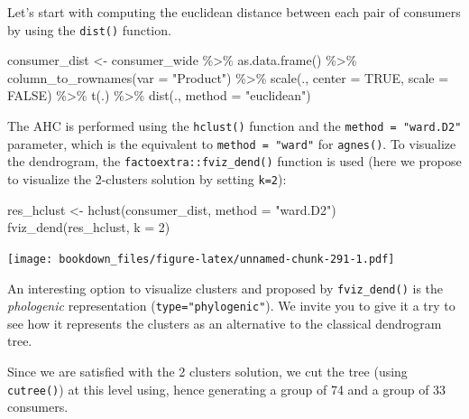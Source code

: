 \documentclass[
]{krantz}
\makeatletter
\newenvironment{Shaded}{\begin{snugshade}}{\end{snugshade}}
\newcommand{\AttributeTok}[1]{\textcolor[rgb]{0.61,0.61,0.61}{#1}}
\newcommand{\ConstantTok}[1]{\textcolor[rgb]{0,0,0}{#1}}
\newcommand{\DecValTok}[1]{\textcolor[rgb]{0.06,0.06,0.06}{#1}}
\newcommand{\FunctionTok}[1]{\textcolor[rgb]{0,0,0}{#1}}
\newcommand{\NormalTok}[1]{#1}
\newcommand{\OtherTok}[1]{\textcolor[rgb]{0.37,0.37,0.37}{#1}}
\newcommand{\SpecialCharTok}[1]{\textcolor[rgb]{0,0,0}{#1}}
\newcommand{\StringTok}[1]{\textcolor[rgb]{0.5,0.5,0.5}{#1}}
\renewenvironment{quote}{\begin{VF}}{\end{VF}}
\newenvironment{kframe}{%
\medskip{}
\setlength{\fboxsep}{.8em}
 \def\at@end@of@kframe{}%
 \ifinner\ifhmode%
  \def\at@end@of@kframe{\end{minipage}}%
  \begin{minipage}{\columnwidth}%
 \fi\fi%
 \def\FrameCommand##1{\hskip\@totalleftmargin \hskip-\fboxsep
 \colorbox{shadecolor}{##1}\hskip-\fboxsep
     \hskip-\linewidth \hskip-\@totalleftmargin \hskip\columnwidth}%
 \MakeFramed {\advance\hsize-\width
   \@totalleftmargin\z@ \linewidth\hsize
   \@setminipage}}%
 {\par\unskip\endMakeFramed%
 \at@end@of@kframe}
\renewenvironment{Shaded}{\begin{kframe}}{\end{kframe}}
\makeatother
\begin{document}
Let's start with computing the euclidean distance between each pair of consumers by using the \texttt{dist()} function.

\begin{Shaded}
\begin{Highlighting}[]
\NormalTok{consumer\_dist }\OtherTok{\textless{}{-}}\NormalTok{ consumer\_wide }\SpecialCharTok{\%\textgreater{}\%}
  \FunctionTok{as.data.frame}\NormalTok{() }\SpecialCharTok{\%\textgreater{}\%}
  \FunctionTok{column\_to\_rownames}\NormalTok{(}\AttributeTok{var =} \StringTok{"Product"}\NormalTok{) }\SpecialCharTok{\%\textgreater{}\%}
  \FunctionTok{scale}\NormalTok{(., }\AttributeTok{center =} \ConstantTok{TRUE}\NormalTok{, }\AttributeTok{scale =} \ConstantTok{FALSE}\NormalTok{) }\SpecialCharTok{\%\textgreater{}\%}
  \FunctionTok{t}\NormalTok{(.) }\SpecialCharTok{\%\textgreater{}\%}
  \FunctionTok{dist}\NormalTok{(., }\AttributeTok{method =} \StringTok{"euclidean"}\NormalTok{)}
\end{Highlighting}
\end{Shaded}

The AHC is performed using the \texttt{hclust()} function and the \texttt{method\ =\ "ward.D2"} parameter, which is the equivalent to \texttt{method\ =\ "ward"} for \texttt{agnes()}. To visualize the dendrogram, the \texttt{factoextra::fviz\_dend()} function is used (here we propose to visualize the 2-clusters solution by setting \texttt{k=2}):

\begin{Shaded}
\begin{Highlighting}[]
\NormalTok{res\_hclust }\OtherTok{\textless{}{-}} \FunctionTok{hclust}\NormalTok{(consumer\_dist, }\AttributeTok{method =} \StringTok{"ward.D2"}\NormalTok{)}
\FunctionTok{fviz\_dend}\NormalTok{(res\_hclust, }\AttributeTok{k =} \DecValTok{2}\NormalTok{)}
\end{Highlighting}
\end{Shaded}

\texttt{[image: bookdown\_files/figure-latex/unnamed-chunk-291-1.pdf]}

\begin{quote}
An interesting option to visualize clusters and proposed by \texttt{fviz\_dend()} is the \emph{phologenic} representation (\texttt{type="phylogenic"}). We invite you to give it a try to see how it represents the clusters as an alternative to the classical dendrogram tree.
\end{quote}

Since we are satisfied with the 2 clusters solution, we cut the tree (using \texttt{cutree()}) at this level using, hence generating a group of 74 and a group of 33 consumers.
\end{document}

